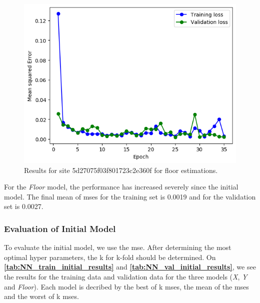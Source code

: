 \begin{figure}[H]
    \centering
    \includegraphics[scale=0.5]{Images/Experiments/NN/1.initial/exp4_floor_5d27075f03f801723c2e360f.png}
    \caption{Results for site 5d27075f03f801723c2e360f for floor estimations.}
    \label{fig:exp4_floor}
\end{figure}

For the \textit{Floor} model, the performance has increased severely since the initial model. The final mean of \gls{mse}s for the training set is 0.0019 and for the validation set is 0.0027.





\subsubsection{Evaluation of Initial Model}
To evaluate the initial model, we use the \gls{mse}. After determining the most optimal hyper parameters, the k for k-fold should be determined. On \textbf{\autoref{tab:NN_train_initial_results}} and \textbf{\autoref{tab:NN_val_initial_results}}, we see the results for the training data and validation data for the three models (\textit{X}, \textit{Y} and \textit{Floor}). Each model is decribed by the best of k \gls{mse}s, the mean of the \gls{mse}s and the worst of k \gls{mse}s.

